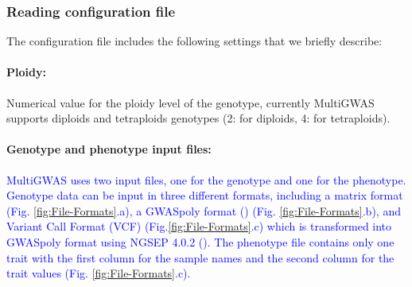 \documentclass{article}
\begin{document}
\subsubsection{Reading configuration file\label{section-Reading-configuration-file}}

The configuration file includes the following settings that we briefly describe:%

\paragraph{{Ploidy:}} Numerical value for the ploidy level of the genotype, currently MultiGWAS supports diploids and tetraploids genotypes (2: for diploids, 4: for tetraploids).



\paragraph{Genotype and phenotype input files:}

\textcolor{blue}{MultiGWAS uses two input files, one for the genotype and one for the phenotype. Genotype data can be input in three different formats, including a matrix format (Fig. \ref{fig:File-Formats}.a), a GWASpoly format (\cite{Rosyara2016}) (Fig. \ref{fig:File-Formats}.b), and Variant Call Format (VCF) (Fig.\ref{fig:File-Formats}.c) which is transformed into GWASpoly format using NGSEP 4.0.2 (\cite{Duitama2019}). The phenotype file contains only one trait with the first column for the sample names and the second column for the trait values (Fig. \ref{fig:File-Formats}.c).}
\end{document}
